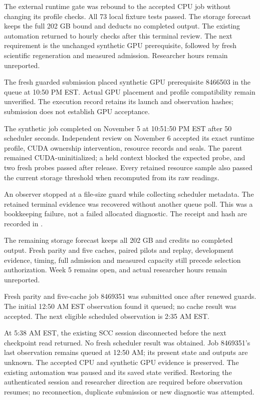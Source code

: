 The external runtime gate was rebound to the accepted CPU job without changing
its profile checks. All 73 local fixture tests passed. The storage forecast keeps
the full 202 GB bound and deducts no completed output. The existing automation
returned to hourly checks after this terminal review. The next requirement is
the unchanged synthetic GPU prerequisite, followed by fresh scientific
regeneration and measured admission. Researcher hours remain unreported.

The fresh guarded submission placed synthetic GPU prerequisite 8466503 in the
queue at 10:50 PM EST. Actual GPU placement and profile compatibility remain
unverified. The execution record retains its launch and observation hashes;
submission does not establish GPU acceptance.


The synthetic job completed on November 5 at 10:51:50 PM EST after 50 scheduler
seconds. Independent review on November 6 accepted its exact runtime profile,
CUDA ownership intervention, resource records and seals. The parent remained
CUDA-uninitialized; a held context blocked the expected probe, and two fresh
probes passed after release. Every retained resource sample also passed the
current storage threshold when recomputed from its raw readings.

An observer stopped at a file-size guard while collecting scheduler metadata.
The retained terminal evidence was recovered without another queue poll. This
was a bookkeeping failure, not a failed allocated diagnostic. The receipt and
hash are recorded in .

The remaining storage forecast keeps all 202 GB and credits no completed output.
Fresh parity and five caches, paired pilots and replay, development evidence,
timing, full admission and measured capacity still precede selection authorization.
Week 5 remains open, and actual researcher hours remain unreported.

Fresh parity and five-cache job 8469351 was submitted once after renewed guards.
The initial 12:50 AM EST observation found it queued; no cache result was accepted.
The next eligible scheduled observation is 2:35 AM EST.

At 5:38 AM EST, the existing SCC session disconnected before the next checkpoint
read returned. No fresh scheduler result was obtained. Job 8469351's last
observation remains queued at 12:50 AM; its present state and outputs are unknown.
The accepted CPU and synthetic GPU evidence is preserved. The existing automation
was paused and its saved state verified. Restoring the authenticated session and
researcher direction are required before observation resumes; no reconnection,
duplicate submission or new diagnostic was attempted.

